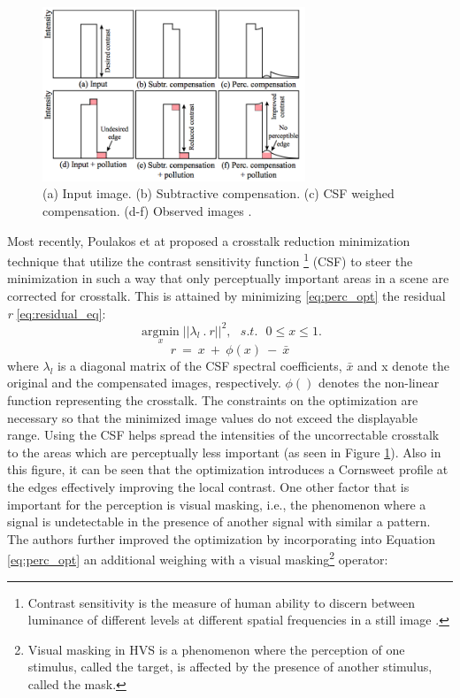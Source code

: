 \begin{figure}
\centering
    \includegraphics[width=0.7\textwidth]{./Template_Figures/perceptual_ct}
    \caption{(a) Input image. (b) Subtractive compensation. (c) CSF weighed compensation. (d-f) Observed images \cite{van2011perceptually}.\label{fig:perc_opt}}
\end{figure}
 Most recently, Poulakos et at\cite{van2011perceptually} proposed a crosstalk reduction minimization technique that utilize the contrast sensitivity function \footnote{Contrast sensitivity is the measure of human ability to discern between luminance of different levels at different spatial frequencies in a still image \cite{ wiki:CSF}. } (CSF) to steer the minimization in such a way that only perceptually important areas in a scene are corrected for crosstalk. This is attained by minimizing \ref{eq:perc_opt} the residual \emph{r} \ref{eq:residual_eq}:
 \begin{equation}
\underset{x}{\operatorname{argmin}}||\lambda_l \: . \: r||^2, \:\:\: s.t. \:\:\: 0 \leq x \leq 1.
\label{eq:perc_opt}
\end{equation}
\begin{equation}
r\: = \: x\: + \: \phi(x)\: - \: \bar{x}
\label{eq:residual_eq}
\end{equation}
where $\lambda_l$ is a diagonal matrix of the CSF spectral coefficients, $\bar{x}$ and x denote the original and the compensated images, respectively. $\phi()$ denotes the non-linear function representing the crosstalk. The constraints on the optimization are necessary so that the minimized image values do not exceed the displayable range. Using the CSF helps spread the intensities of the uncorrectable crosstalk to the areas which are perceptually less important (as seen in Figure \ref{fig:perc_opt}). Also in this figure, it can be seen that the optimization introduces a Cornsweet profile at the edges effectively improving the local contrast. One other factor that is important for the perception is visual masking, i.e., the phenomenon where a signal is undetectable in the presence of another signal with similar a pattern. The authors further improved the optimization by incorporating into Equation \ref{eq:perc_opt} an additional weighing with a visual masking\footnote{Visual masking in HVS is a phenomenon where the perception of one stimulus, called the target, is affected by the presence of another stimulus, called the mask.} operator:
